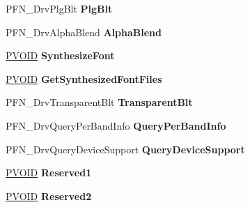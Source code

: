 \begin{DoxyCompactItemize}
P\+F\+N\+\_\+\+Drv\+Plg\+Blt {\bfseries Plg\+Blt}
\item 
\mbox{\label{struct___d_r_i_v_e_r___f_u_n_c_t_i_o_n_s_a91750eb3c78b72f0fc0cedc4d13bd8de}} 
P\+F\+N\+\_\+\+Drv\+Alpha\+Blend {\bfseries Alpha\+Blend}
\item 
\mbox{\label{struct___d_r_i_v_e_r___f_u_n_c_t_i_o_n_s_a5a77c2b39080300fa4da6a25c646eae7}} 
\hyperlink{interfacevoid}{P\+V\+O\+ID} {\bfseries Synthesize\+Font}
\item 
\mbox{\label{struct___d_r_i_v_e_r___f_u_n_c_t_i_o_n_s_a8d23661ab4f65d60ffecd32b8b3803ad}} 
\hyperlink{interfacevoid}{P\+V\+O\+ID} {\bfseries Get\+Synthesized\+Font\+Files}
\item 
\mbox{\label{struct___d_r_i_v_e_r___f_u_n_c_t_i_o_n_s_abe9b4cea4a179170f323fa24d5125587}} 
P\+F\+N\+\_\+\+Drv\+Transparent\+Blt {\bfseries Transparent\+Blt}
\item 
\mbox{\label{struct___d_r_i_v_e_r___f_u_n_c_t_i_o_n_s_abf8d6e0b631041759c1e1ac03b6470c6}} 
P\+F\+N\+\_\+\+Drv\+Query\+Per\+Band\+Info {\bfseries Query\+Per\+Band\+Info}
\item 
\mbox{\label{struct___d_r_i_v_e_r___f_u_n_c_t_i_o_n_s_adb21fee281f850697edebcf433fc9fd7}} 
P\+F\+N\+\_\+\+Drv\+Query\+Device\+Support {\bfseries Query\+Device\+Support}
\item 
\mbox{\label{struct___d_r_i_v_e_r___f_u_n_c_t_i_o_n_s_afcf60061b7c33b1b81271aaee8b78467}} 
\hyperlink{interfacevoid}{P\+V\+O\+ID} {\bfseries Reserved1}
\item 
\mbox{\label{struct___d_r_i_v_e_r___f_u_n_c_t_i_o_n_s_ae26cf4e9ebda45b7bc75e5e0abaf9e89}} 
\hyperlink{interfacevoid}{P\+V\+O\+ID} {\bfseries Reserved2}
\item 
\mbox{\label{struct___d_r_i_v_e_r___f_u_n_c_t_i_o_n_s_a368a2d1ab750c7bfb595f5d7b514a49c}} 

\end{DoxyCompactItemize}
